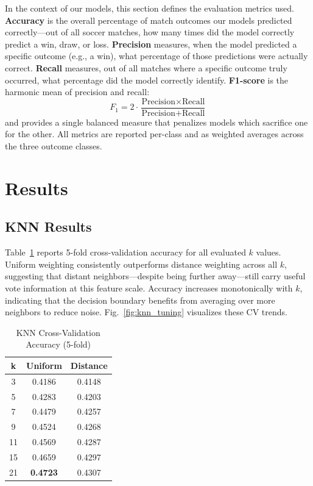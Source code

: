 \documentclass[conference]{IEEEtran}
\begin{document}
In the context of our models, this section defines the evaluation metrics used. \textbf{Accuracy} is the overall percentage of match outcomes our models predicted correctly---out of all soccer matches, how many times did the model correctly predict a win, draw, or loss. \textbf{Precision} measures, when the model predicted a specific outcome (e.g., a win), what percentage of those predictions were actually correct. \textbf{Recall} measures, out of all matches where a specific outcome truly occurred, what percentage did the model correctly identify. \textbf{F1-score} is the harmonic mean of precision and recall:
\begin{equation}
  F_1 = 2 \cdot \frac{\text{Precision} \times \text{Recall}}{\text{Precision} + \text{Recall}}
\end{equation}
and provides a single balanced measure that penalizes models which sacrifice one for the other. All metrics are reported per-class and as weighted averages across the three outcome classes.

\section{Results}

\subsection{KNN Results}

Table~\ref{tab:knn_cv} reports 5-fold cross-validation accuracy for all evaluated $k$ values. Uniform weighting consistently outperforms distance weighting across all $k$, suggesting that distant neighbors---despite being further away---still carry useful vote information at this feature scale. Accuracy increases monotonically with $k$, indicating that the decision boundary benefits from averaging over more neighbors to reduce noise. Fig.~\ref{fig:knn_tuning} visualizes these CV trends.

\begin{table}[h]
\caption{KNN Cross-Validation Accuracy (5-fold)}
\label{tab:knn_cv}
\centering
\begin{tabular}{ccc}
\toprule
\textbf{k} & \textbf{Uniform} & \textbf{Distance} \\
\midrule
3  & 0.4186 & 0.4148 \\
5  & 0.4283 & 0.4203 \\
7  & 0.4479 & 0.4257 \\
9  & 0.4524 & 0.4268 \\
11 & 0.4569 & 0.4287 \\
15 & 0.4659 & 0.4297 \\
21 & \textbf{0.4723} & 0.4307 \\
\bottomrule
\end{tabular}
\end{table}
\end{document}
